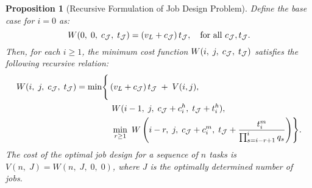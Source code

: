 \documentclass{article}
\theoremstyle{plain}
\theoremstyle{plain}
\newtheorem{proposition}[theorem]{Proposition}
\begin{document}
\begin{proposition}[Recursive Formulation of Job Design Problem]
\label{prop:recursive_optimality}
Define the base case for $i=0$ as:
\[
W(0,\; 0,\; c_{\mathcal{J}},\; t_{\mathcal{J}}) 
= 
\left(v_L + c_{\mathcal{J}}\right) t_{\mathcal{J}}, 
\quad
\text{for all $c_{\mathcal{J}}, t_{\mathcal{J}}$}.
\]
Then, for each $i \geq 1$, the minimum cost function $W(i,\; j,\; c_{\mathcal{J}},\; t_{\mathcal{J}})$ satisfies the following recursive relation:
\begin{align*}
W(i,\; j,\; c_{\mathcal{J}},\; t_{\mathcal{J}})
= \min\Biggl\{ 
& \left(v_L + c_{\mathcal{J}}\right) t_{\mathcal{J}} \; + \; V(i,j), \\
& \ W(i-1,\; j,\; c_{\mathcal{J}} + c^{h}_{i},\; t_{\mathcal{J}} + t^{h}_{i}), \\
& \ \min_{r \geq 1} \ W\left(i - r,\; j,\; c_{\mathcal{J}} + c^{m}_{i},\; t_{\mathcal{J}} + \frac{t^{m}_{i}}{\prod_{s=i-r+1}^{i} q_s}\right)
\Biggr\}.
\end{align*}
The cost of the optimal job design for a sequence of $n$ tasks is $V(n,\; J) = W(n,\; J,\; 0,\; 0)$, where $J$ is the optimally determined number of jobs.
\end{proposition}
\end{document}
